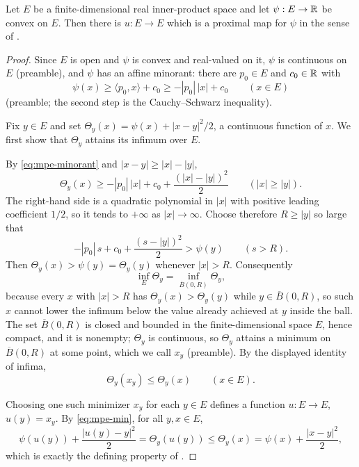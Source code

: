\begin{lemma}
Let $E$ be a finite-dimensional real inner-product space and let $\psi:E\to\mathbb{R}$
be convex on $E$. Then there is $u:E\to E$ which is a proximal map for $\psi$ in
the sense of .
\end{lemma}
\begin{proof}
Since $E$ is open and $\psi$ is convex and real-valued on it, $\psi$ is
continuous on $E$ (preamble), and $\psi$ has an affine minorant: there are
$p_0\in E$ and $c_0\in\mathbb{R}$ with
\begin{equation}\label{eq:mpe-minorant}
  \psi(x)\ge\langle p_0,x\rangle+c_0\ge-|p_0|\,|x|+c_0\qquad(x\in E)
\end{equation}
(preamble; the second step is the Cauchy--Schwarz inequality).

Fix $y\in E$ and set $\Theta_y(x)=\psi(x)+|x-y|^2/2$, a continuous function of
$x$. We first show that $\Theta_y$ attains its infimum over $E$.

By \eqref{eq:mpe-minorant} and $|x-y|\ge|x|-|y|$,
\[
  \Theta_y(x)\ge-|p_0|\,|x|+c_0+\frac{(|x|-|y|)^2}{2}
  \qquad(|x|\ge|y|).
\]
The right-hand side is a quadratic polynomial in $|x|$ with positive leading
coefficient $1/2$, so it tends to $+\infty$ as $|x|\to\infty$. Choose therefore
$R\ge|y|$ so large that
\[
  -|p_0|\,s+c_0+\frac{(s-|y|)^2}{2}>\psi(y)\qquad(s>R).
\]
Then $\Theta_y(x)>\psi(y)=\Theta_y(y)$ whenever $|x|>R$. Consequently
\[
  \inf_{E}\Theta_y=\inf_{\overline B(0,R)}\Theta_y,
\]
because every $x$ with $|x|>R$ has $\Theta_y(x)>\Theta_y(y)$ while
$y\in\overline B(0,R)$, so such $x$ cannot lower the infimum below the value
already achieved at $y$ inside the ball. The set $\overline B(0,R)$ is closed and
bounded in the finite-dimensional space $E$, hence compact, and it is nonempty;
$\Theta_y$ is continuous, so $\Theta_y$ attains a minimum on $\overline B(0,R)$
at some point, which we call $x_y$ (preamble). By the displayed identity of
infima,
\begin{equation}\label{eq:mpe-min}
  \Theta_y(x_y)\le\Theta_y(x)\qquad(x\in E).
\end{equation}

Choosing one such minimizer $x_y$ for each $y\in E$ defines a function
$u:E\to E$, $u(y)=x_y$. By \eqref{eq:mpe-min}, for all $y,x\in E$,
\[
  \psi(u(y))+\frac{|u(y)-y|^2}{2}=\Theta_y(u(y))\le\Theta_y(x)
   =\psi(x)+\frac{|x-y|^2}{2},
\]
which is exactly the defining property of .
\end{proof}
